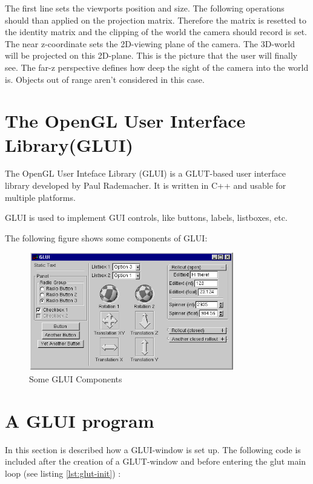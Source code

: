 \documentclass[10pt,a4paper,DIV=11]{scrreprt}
\begin{document}
The first line sets the viewports position and size. The following operations should than applied on the projection matrix. Therefore the matrix is resetted to the identity matrix and the clipping of the world the camera should record is set. The near z-coordinate sets the 2D-viewing plane of the camera. The 3D-world will be projected on this 2D-plane. This is the picture that the user will finally see. The far-z perspective defines how deep the sight of the camera into the world is. Objects out of range aren't considered in this case. \\

\section{The OpenGL User Interface Library(GLUI)}
\label{sec:glui}
The OpenGL User Inteface Library (GLUI) is a GLUT-based user interface library developed by Paul Rademacher\cite{rad}. It is written in C++ and usable for multiple platforms.

GLUI is used to implement GUI controls, like buttons, labels, listboxes, etc.

The following figure shows some components of GLUI:

\begin{center}
	\begin{figure}[H]
		\centering
		\includegraphics[width=0.8\textwidth,scale=1.0]{files/glui.png}  
		\caption{Some GLUI Components \cite{rad}}
		\label{fig:ogl-glui}
	\end{figure}
\end{center}

\newpage

\section{A GLUI program}
In this section is described how a GLUI-window is set up.
The following code is included after the creation of a GLUT-window and before entering the glut main loop (see listing \ref{lst:glut-init}) :
\end{document}
